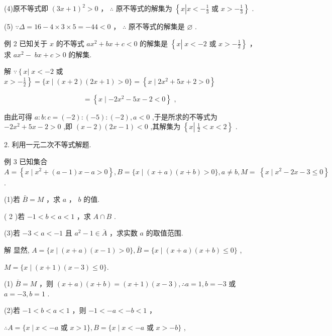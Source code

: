 \documentclass[10pt]{article}
\begin{document}
(4)原不等式即 \({\left( 3x + 1\right) }^{2} > 0\) ， \(\therefore\) 原不等式的解集为 \(\left\{  {x\left| {x <  - \frac{1}{3}}\right. \text{ 或 }x >  - \frac{1}{3}}\right\}\) .

(5) \(\because \Delta  = {16} - 4 \times  3 \times  5 =  - {44} < 0\) ， \(\therefore\) 原不等式的解集是 \(\varnothing\) .

例 2 已知关于 \(x\) 的不等式 \(a{x}^{2} + {bx} + c < 0\) 的解集是 \(\left\{  {x\left| {\;x <  - 2\text{ 或 }x >  - \frac{1}{2}}\right. }\right\}\) ，求 \(a{x}^{2} - \; {bx} + c > 0\) 的解集.

解 \(\because \left\{  {x\left| {\;x <  - 2}\right. }\right.\) 或 \(\left. {x >  - \frac{1}{2}}\right\}   = \{ x \mid  \left( {x + 2}\right) \left( {{2x} + 1}\right)  > 0\}  = \left\{  {x \mid  2{x}^{2} + {5x} + 2 > 0}\right\}\)

\[
= \left\{  {x \mid   - 2{x}^{2} - {5x} - 2 < 0}\right\}  \text{ , }
\]

由此可得 \(a : b : c = \left( {-2}\right)  : \left( {-5}\right)  : \left( {-2}\right) ,a < 0\) ,于是所求的不等式为 \(- 2{x}^{2} + {5x} - 2 > 0\) ,即 \(\left( {x - 2}\right) \left( {{2x} - 1}\right)  < 0\) ,其解集为 \(\left\{  {x\left| {\;\frac{1}{2} < x < 2}\right. }\right\}\) .

2. 利用一元二次不等式解题.

例 3 已知集合 \(A = \left\{  {x \mid  {x}^{2} + \left( {a - 1}\right) x - a > 0}\right\}  ,B = \{ x \mid  \left( {x + a}\right) \left( {x + b}\right)  > 0\} ,a \neq  b,M = \; \left\{  {x \mid  {x}^{2} - {2x} - 3 \leq  0}\right\}\) .

(1)若 \(\bar{B} = M\) ，求 \(a\) ， \(b\) 的值.

( 2 )若 \(- 1 < b < a < 1\) ，求 \(A \cap  B\) .

(3)若 \(- 3 < a <  - 1\) 且 \({a}^{2} - 1 \in  \bar{A}\) ，求实数 \(a\) 的取值范围.

解 显然, \(A = \{ x \mid  \left( {x + a}\right) \left( {x - 1}\right)  > 0\} ,\bar{B} = \{ x \mid  \left( {x + a}\right) \left( {x + b}\right)  \leq  0\}\) ,

\(M = \{ x \mid  \left( {x + 1}\right) \left( {x - 3}\right)  \leq  0\} .\)

(1) \(\bar{B} = M\) ，则 \(\left( {x + a}\right) \left( {x + b}\right)  = \left( {x + 1}\right) \left( {x - 3}\right) ,\therefore a = 1,b =  - 3\) 或 \(a =  - 3,b = 1\) .

(2)若 \(- 1 < b < a < 1\) ，则 \(- 1 <  - a <  - b < 1\) ，

\(\therefore A = \{ x \mid  x <  - a\) 或 \(x > 1\} ,B = \{ x \mid  x <  - a\) 或 \(x >  - b\}\) ,
\end{document}
